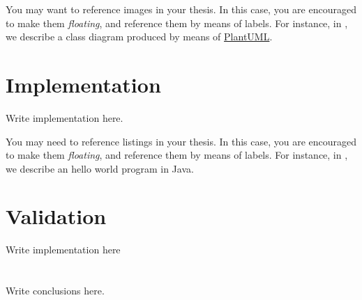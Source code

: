 \documentclass[12pt,a4paper,openright,twoside]{book}
\begin{document}
You may want to reference images in your thesis.
%
In this case, you are encouraged to make them \emph{floating}, and reference them by means of labels.
%
For instance, in , we describe a class diagram produced by means of \href{http://plantuml.com}{PlantUML}.

\chapter{Implementation} %
\label{chap:implementation}

Write implementation here.



You may need to reference listings in your thesis.
%
In this case, you are encouraged to make them \emph{floating}, and reference them by means of labels.
%
For instance, in , we describe an hello world program in Java.

\chapter{Validation} %
\label{chap:validation}

Write implementation here

\chapter{\conclusionsname}
\label{chap:conclusions}

Write conclusions here.



\nocite{*} %


\end{document}
